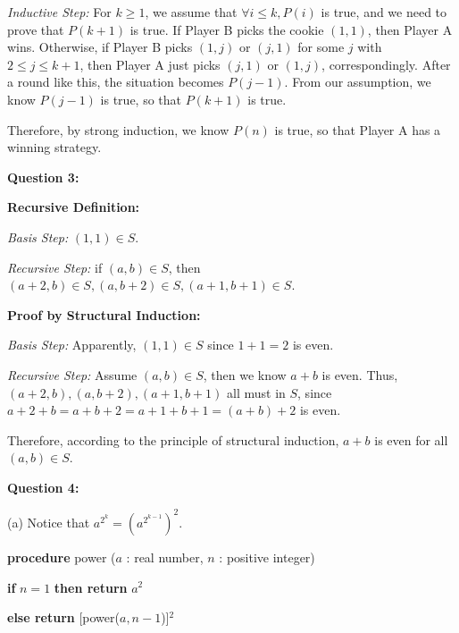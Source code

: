 \documentclass[a4paper,11pt]{article}
\begin{document}
\begin{spacing}{1.4}
    \textit{Inductive Step:}
    For $k\ge 1$, we assume that $\forall i\le k, P(i)$ is true,
    and we need to prove that $P(k+1)$ is true. If Player B
    picks the cookie $(1,1)$, then Player A wins. Otherwise, if Player
    B picks $(1,j)$ or $(j,1)$ for some $j$ with $2\le j\le k+1$,
    then Player A just picks $(j,1)$ or $(1,j)$, correspondingly.
    After a round like this, the situation becomes $P(j-1)$. 
    From our assumption, we know $P(j-1)$ is true, so that $P(k+1)$
    is true.

    Therefore, by strong induction, we know $P(n)$ is true, so that 
    Player A has a winning strategy.

    \vspace{20pt}

    \setlength{\parindent}{0em}

    \textbf{Question 3:}

    \textbf{Recursive Definition:}

    \hspace{2em} \textit{Basis Step:} $(1, 1)\in S$.

    \hspace{2em} \textit{Recursive Step:} 
    if $(a, b)\in S$, then $(a+2, b)\in S, (a, b+2) \in S, (a+1, b+1)\in S$.


    \textbf{Proof by Structural Induction:}

    \hspace{2em} \textit{Basis Step:} 
    Apparently, $(1, 1)\in S$ since $1+1=2$ is even.
    
    \hspace{2em} \textit{Recursive Step:} 
    Assume $(a,b)\in S$, then we know $a+b$ is even. Thus, 
    $(a+2, b), (a, b+2),  (a+1, b+1)$ all must in $S$, since
    $a+2+b=a+b+2=a+1+b+1=(a+b)+2$ is even.

    Therefore, according to the principle of structural induction,
    $a+b$ is even for all $(a,b)\in S$.


    \vspace{20pt}

    \textbf{Question 4:}

    (a) Notice that $a^{2^k}=(a^{2^{k-1}})^2.$

    \setlength{\parindent}{4em}

    \textbf{procedure} power ($a$ : real number, $n$ : positive integer) 
    
    \textbf{if} $n = 1$ \textbf{then return} $a^2$

    \textbf{else return} [power($a, n-1$)]$^2$


\end{spacing}
\end{document}
